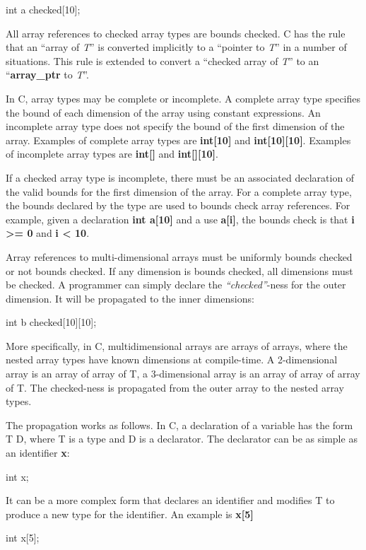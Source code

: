 \documentclass[]{article}
\begin{document}
int a checked{[}10{]};

All array references to checked array types are bounds checked. C has
the rule that an ``array of \emph{T}'' is converted implicitly to a
``pointer to \emph{T}'' in a number of situations. This rule is extended
to convert a ``checked array of \emph{T}'' to an ``\textbf{array\_ptr}
to \emph{T}''.

In C, array types may be complete or incomplete. A complete array type
specifies the bound of each dimension of the array using constant
expressions. An incomplete array type does not specify the bound of the
first dimension of the array. Examples of complete array types are
\textbf{int{[}10{]}} and \textbf{int{[}10{]}{[}10{]}}. Examples of
incomplete array types are \textbf{int{[}{]}} and
\textbf{int{[}{]}{[}10{]}}.

If a checked array type is incomplete, there must be an associated
declaration of the valid bounds for the first dimension of the array.
For a complete array type, the bounds declared by the type are used to
bounds check array references. For example, given a declaration
\textbf{int a{[}10{]}} and a use \textbf{a{[}i{]}}, the bounds check is
that \textbf{i \textgreater{}= 0} and \textbf{i \textless{} 10}.

Array references to multi-dimensional arrays must be uniformly bounds
checked or not bounds checked. If any dimension is bounds checked, all
dimensions must be checked. A programmer can simply declare the
\emph{``checked''}-ness for the outer dimension. It will be propagated
to the inner dimensions:

int b checked{[}10{]}{[}10{]};

More specifically, in C, multidimensional arrays are arrays of arrays,
where the nested array types have known dimensions at compile-time. A
2-dimensional array is an array of array of T, a 3-dimensional array is
an array of array of array of T. The checked-ness is propagated from the
outer array to the nested array types.

The propagation works as follows. In C, a declaration of a variable has
the form T D, where T is a type and D is a declarator. The declarator
can be as simple as an identifier \textbf{x}:

int x;

It can be a more complex form that declares an identifier and modifies T
to produce a new type for the identifier. An example is
\textbf{x{[}5{]}}

int x{[}5{]};
\end{document}
